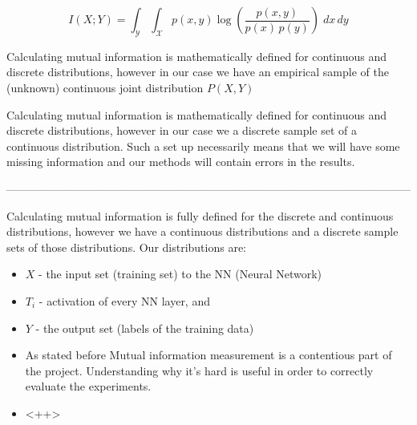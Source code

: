 \begin{equation}
    {I} (X;Y)=\int _{\mathcal {Y}}\int _{\mathcal {X}}{p(x,y)\log {\left({\frac
    {p(x,y)}{p(x)\,p(y)}}\right)}}\;dx\,dy
\end{equation}

Calculating mutual information is mathematically defined for continuous and
discrete distributions, however in our case we have an empirical sample of the
(unknown) continuous joint distribution $P(X, Y)$

Calculating mutual information is mathematically defined for continuous and
discrete distributions, however in our case we a discrete sample set of a
continuous distribution. Such a set up necessarily means that we will have some
missing information and our methods will contain errors in the results.

------------------------------------------------------------------------------------------------------------

Calculating mutual information is fully defined for the discrete and continuous
distributions, however we have a continuous distributions and a discrete sample
sets of those distributions. Our distributions are:
\begin{itemize}
  \item{
      $X$ - the input set (training set) to the NN (Neural Network)
    }
  \item{
      $T_i$ - activation of every NN layer, and
    }
  \item{
      $Y$ - the output set (labels of the training data)
    }
\end{itemize}


\begin{itemize}
  \item{
      As stated before Mutual information measurement is a contentious part of
      the project. Understanding why it's hard is useful in order to correctly
      evaluate the experiments.
    }
  \item{
      <++>
    }
\end{itemize}

